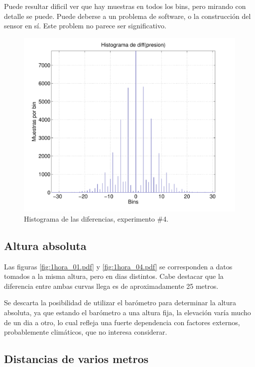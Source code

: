 \documentclass[spanish,12pt,a4paper,titlepage]{report}
\begin{document}
Puede resultar dificil ver que hay muestras en todos los bins, pero mirando con detalle se puede. Puede deberse a un problema de software, o la construcción del sensor en sí. Este problem no parece ser significativo.
\vspace{-14pt}
\begin{figure}[h!]
\centering
  \includegraphics[width=.75\textwidth]{./pics/barom_hist_exp4.pdf}
\vspace{-15pt}
  \caption{Histograma de las diferencias, experimento \#4.}
  \label{fig:barom_hist_exp4.pdf}
\end{figure}
\vspace{-40pt}


\newpage
\subsection{Altura absoluta}

Las figuras \ref{fig:1hora_01.pdf} y \ref{fig:1hora_04.pdf} se corresponden a datos tomados a la misma altura, pero en dias distintos. Cabe destacar que la diferencia entre ambas curvas llega es de aproximadamente 25 metros.

Se descarta la posibilidad de utilizar el barómetro para determinar la altura absoluta, ya que estando el barómetro a una altura fija, la elevación varía mucho de un dia a otro, lo cual refleja una fuerte dependencia con factores externos, probablemente climáticos, que no interesa considerar.

\subsection{Distancias de varios metros}
\end{document}
